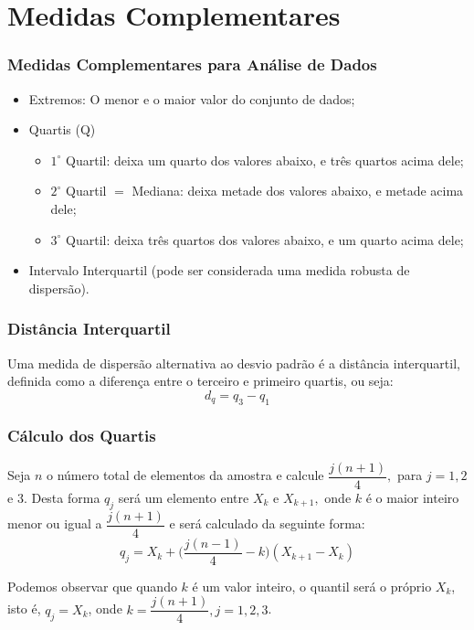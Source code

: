 \documentclass[14pt,aspectratio=1610]{beamer}
\begin{document}
\section{Medidas Complementares}
\begin{frame}{}
\frametitle{Medidas Complementares para Análise de Dados}
\begin{block}{}
\justifying
\begin{itemize}
\item Extremos: O menor e o maior valor do conjunto de dados;
\item Quartis (Q)
\begin{itemize}
\item $1^{\circ}$ Quartil: deixa um quarto dos valores abaixo, e três quartos acima dele;
\item $2^{\circ}$ Quartil $=$ Mediana: deixa metade dos valores abaixo, e metade acima dele;
\item $3^{\circ}$ Quartil: deixa três quartos dos valores abaixo, e um quarto acima dele;
\end{itemize}
\item Intervalo Interquartil (pode ser considerada uma medida robusta de dispersão).
\end{itemize}
\end{block}
\end{frame}

\begin{frame}{}
\frametitle{Distância Interquartil}
\begin{block}{}
\justifying
Uma medida de dispersão alternativa ao desvio padrão é a distância interquartil, definida como a diferença entre o terceiro e primeiro quartis, ou seja:
$$d_{q}=q_{3}-q_{1}$$
\end{block}
\end{frame}

\begin{frame}{}
\frametitle{Cálculo dos Quartis}
\begin{block}{}
\justifying
Seja $n$ o número total de elementos da amostra e calcule $\dfrac{j(n+1)}{4},$ para $j=1,2$ e $3$. Desta forma $q_{j}$ será um elemento entre $X_{k}$ e $X_{k+1},$ onde $k$ é o maior inteiro menor ou igual a 
$\dfrac{j(n+1)}{4}$ e será calculado da seguinte forma:
\begin{equation}
q_{j}=X_{k}+\Biggl(\dfrac{j(n-1)}{4}-k\Biggl)(X_{k+1}-X_{k})
\end{equation}

Podemos observar que quando $k$ é um valor inteiro, o quantil será o próprio $X_{k}$, isto é, $q_{j}=X_{k}$, onde 
$k=\dfrac{j(n+1)}{4}, j=1,2,3$.

\end{block}
\end{frame}
\end{document}
